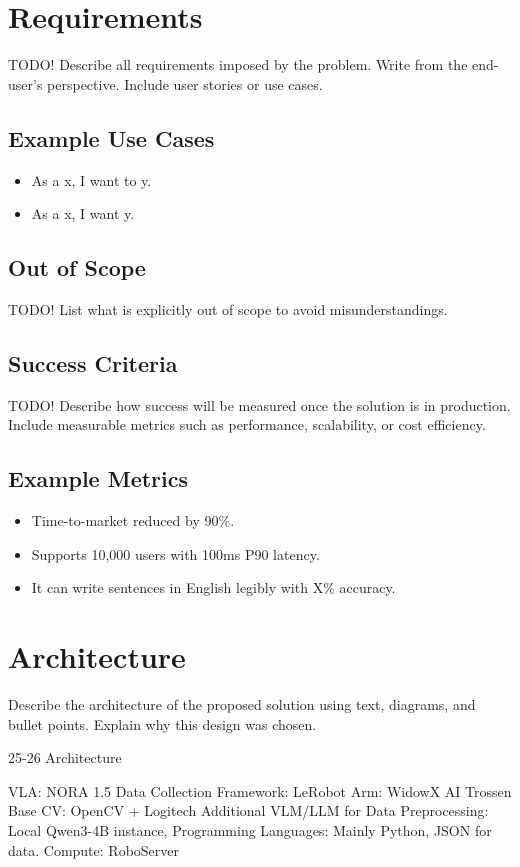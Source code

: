 \documentclass[12pt,a4paper]{article}
\begin{document}
\section{Requirements}
TODO! Describe all requirements imposed by the problem.  
Write from the end-user’s perspective. Include user stories or use cases.

\subsection*{Example Use Cases}
\begin{itemize}
  \item As a x, I want to y.
  \item As a x, I want y.
\end{itemize}
\subsection{Out of Scope}
TODO! List what is explicitly out of scope to avoid misunderstandings.

\subsection{Success Criteria}
TODO! Describe how success will be measured once the solution is in production.  
Include measurable metrics such as performance, scalability, or cost efficiency.

\subsection*{Example Metrics}
\begin{itemize}
  \item Time-to-market reduced by 90\%.
  \item Supports 10,000 users with 100ms P90 latency.
  \item It can write sentences in English legibly with X\% accuracy.
\end{itemize}
\newpage
\section{Architecture}
Describe the architecture of the proposed solution using text, diagrams, and bullet points.  
Explain why this design was chosen.

25-26 Architecture

VLA: NORA 1.5
Data Collection Framework: LeRobot
Arm: WidowX AI Trossen Base
CV: OpenCV + Logitech
Additional VLM/LLM for Data Preprocessing: Local Qwen3-4B instance,
Programming Languages: Mainly Python, JSON for data.
Compute: RoboServer
\end{document}
